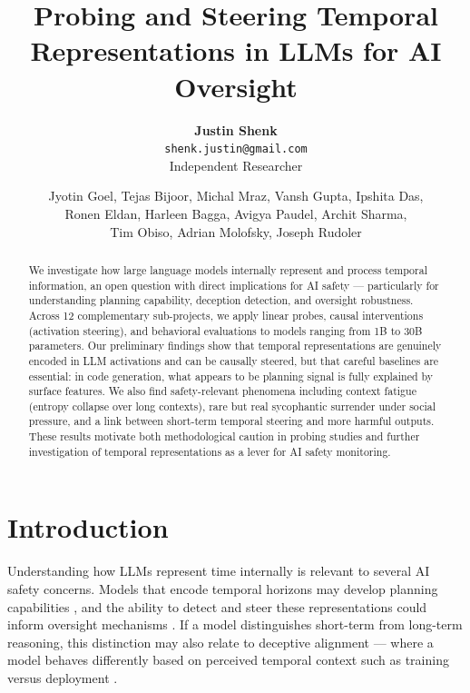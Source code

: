 \documentclass[midterm]{sparreport}
\title{Probing and Steering Temporal Representations in LLMs for AI Oversight}
\author{
  \textbf{Justin Shenk}\\
  \texttt{shenk.justin@gmail.com}\\
  Independent Researcher
  \and
  Jyotin Goel,
  Tejas Bijoor,
  Michal Mraz,
  Vansh Gupta,
  Ipshita Das,\\
  Ronen Eldan,
  Harleen Bagga,
  Avigya Paudel,
  Archit Sharma,\\
  Tim Obiso,
  Adrian Molofsky,
  Joseph Rudoler
}
\begin{document}
\maketitle

\begin{abstract}
We investigate how large language models internally represent and process temporal information, an open question with direct implications for AI safety --- particularly for understanding planning capability, deception detection, and oversight robustness. Across 12 complementary sub-projects, we apply linear probes, causal interventions (activation steering), and behavioral evaluations to models ranging from 1B to 30B parameters. Our preliminary findings show that temporal representations are genuinely encoded in LLM activations and can be causally steered, but that careful baselines are essential: in code generation, what appears to be planning signal is fully explained by surface features. We also find safety-relevant phenomena including context fatigue (entropy collapse over long contexts), rare but real sycophantic surrender under social pressure, and a link between short-term temporal steering and more harmful outputs. These results motivate both methodological caution in probing studies and further investigation of temporal representations as a lever for AI safety monitoring.
\end{abstract}


\section{Introduction}

Understanding how LLMs represent time internally is relevant to several AI safety concerns. Models that encode temporal horizons may develop planning capabilities \cite{wei2022chain}, and the ability to detect and steer these representations could inform oversight mechanisms \cite{elhage2021mathematical}. If a model distinguishes short-term from long-term reasoning, this distinction may also relate to deceptive alignment \cite{hubinger2019risks} --- where a model behaves differently based on perceived temporal context such as training versus deployment \cite{park2023ai}.
\end{document}
